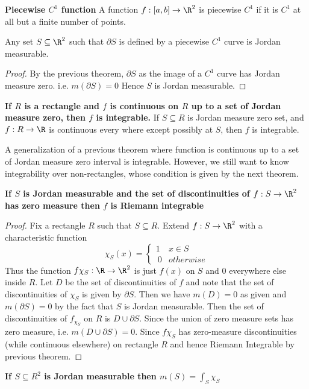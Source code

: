 \documentclass[11pt]{article}
\begin{document}
\begin{defn*}
  \textbf{Piecewise $C^1$ function} A function $f:[a,b]\to\R^2$ is piecewise $C^1$ if it is $C^1$ at all but a finite number of points.
\end{defn*}

\begin{corollary*}
  Any set $S\subseteq \R^2$ such that $\partial S$ is defined by a piecewise $C^1$ curve is Jordan measurable.
  \begin{proof}
    By the previous theorem, $\partial S$ as the image of a $C^1$ curve has Jordan measure zero. i.e. $m(\partial S) = 0$ Hence $S$ is Jordan measurable.
  \end{proof}
\end{corollary*}

\begin{theorem*}
  \textbf{If $R$ is a rectangle and $f$ is continuous on $R$ up to a set of Jordan measure zero, then $f$ is integrable.} If $S \subseteq R$ is Jordan measure zero set, and $f: R \to \R$ is continuous every where except possibly at $S$, then $f$ is integrable.
  \begin{rem}
    A generalization of a previous theorem where function is continuous up to a set of Jordan measure zero interval is integrable. However, we still want to know integrability over non-rectangles, whose condition is given by the next theorem.
  \end{rem}
\end{theorem*}

\begin{theorem*}
  \textbf{If $S$ is Jordan measurable and the set of discontinuities of $f: S\to \R^2$ has zero measure then $f$ is Riemann integrable}
  \begin{proof}
    Fix a rectangle $R$ such that $S\subseteq R$. Extend $f: S \to \R^2$ with a characteristic function
    \[
      \chi_S(x) =
      \begin{cases}
        1 & x\in S\\\
        0 & otherwise
      \end{cases}
    \]
    Thus the function $f \chi_S: \R \to \R^2$ is just $f(x)$ on $S$ and 0 everywhere else inside $R$. Let $D$ be the set of discontinuities of $f$ and note that the set of discontinuities of $\chi_S$ is given by $\partial S$. Then we have $m(D) = 0$ as given and $m(\partial S) = 0$ by the fact that $S$ is Jordan measurable. Then the set of discontinuities of $f_{\chi_S}$ on $R$ is $D\cup \partial S$. Since the union of zero measure sets has zero measure, i.e. $m(D\cup \partial S) = 0$. Since $f\chi_S$ has zero-measure discontinuities (while continuous elsewhere) on rectangle $R$ and hence Riemann Integrable by previous theorem.
  \end{proof}
\end{theorem*}

\begin{corollary*}
  \textbf{If $S\subseteq R^2$ is Jordan measurable then $m(S) = \int_S \chi_S$}
\end{corollary*}
\end{document}
